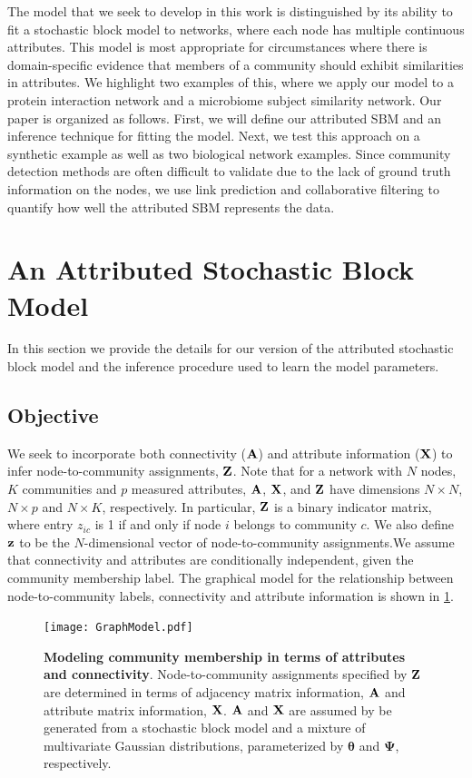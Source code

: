 The model that we seek to develop in this work is distinguished by its ability to fit a stochastic block model to networks, where each node has multiple continuous attributes. This model is most appropriate for circumstances where there is domain-specific evidence that members of a community should exhibit similarities in attributes. We highlight two examples of this, where we apply our model to a protein interaction network and a microbiome subject similarity network. Our paper is organized as follows. First, we will define our attributed SBM and an inference technique for fitting the model. Next, we test this approach on a synthetic example as well as two biological network examples. Since community detection methods are often difficult to validate due to the lack of ground truth information on the nodes, we use link prediction and collaborative filtering to quantify how well the attributed SBM represents the data.

\section{An Attributed Stochastic Block Model}
 In this section we provide the details for our version of the attributed stochastic block model and the inference procedure used to learn the model parameters. 
\subsection{Objective}
We seek to incorporate both connectivity (${\bf A}$) and attribute information (${\bf X}$) to infer node-to-community assignments, ${\bf Z}$. Note that for a network with $N$ nodes, $K$ communities and $p$ measured attributes, ${\bf A}$, ${\bf X}$, and ${\bf Z}$ have dimensions $N \times N$, $N \times p$ and $N \times K$, respectively. In particular, ${\bf Z}$ is a binary indicator matrix, where entry $z_{ic}$ is 1 if and only if node $i$ belongs to community $c$. We also define ${\bf z}$ to be the $N$-dimensional vector of node-to-community assignments.We assume that connectivity and attributes are conditionally independent, given the community membership label. The graphical model for the relationship between node-to-community labels, connectivity and attribute information is shown in \ref{fig:graphical_model}.

\begin{figure}
\begin{center}
\texttt{[image: GraphModel.pdf]}
\caption{{\bf Modeling community membership in terms of attributes and connectivity}. Node-to-community assignments specified by ${\bf Z}$ are determined in terms of adjacency matrix information, ${\bf A}$ and attribute matrix information, ${\bf X}$. ${\bf A}$ and ${\bf X}$ are assumed by be generated from a stochastic block model and a mixture of multivariate Gaussian distributions, parameterized by ${\boldsymbol \theta}$ and ${\boldsymbol \Psi}$, respectively.
\label{fig:graphical_model}} 
\end{center}
\end{figure}

